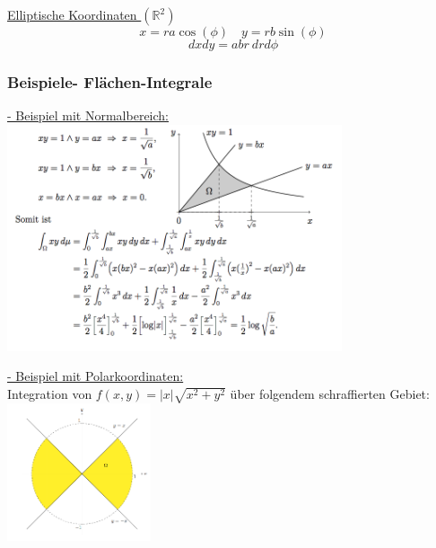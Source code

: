 \documentclass[6pt]{article}
\begin{document}
\begin{multicols*}{3}
		\underline{Elliptische Koordinaten $\left(\mathbb{R}^2\right)$} \vspace{1mm}\\
		\[
			x = ra\cos(\phi) \quad  y = rb\sin(\phi)
		\]
		\[
			dxdy = abr\ drd\phi
		\]
		
			
		\columnbreak
		\subsubsection*{Beispiele- Fl{\"a}chen-Integrale}
		
		
		\underline{- Beispiel mit Normalbereich:} \vspace{1mm} \\

		\includegraphics[width=280pt]{images/normalbereiche1} 

%
%		
		
		\vspace{3mm}

		
		\underline{- Beispiel mit Polarkoordinaten:} \vspace{2mm} \\
		Integration von $f(x,y) = |x| \sqrt{x^2 + y^2}$ {\"u}ber folgendem schraffierten Gebiet: \\
				\includegraphics[width=120pt]{images/Flaechenintegral1} \\
				

\end{multicols*}
\end{document}
